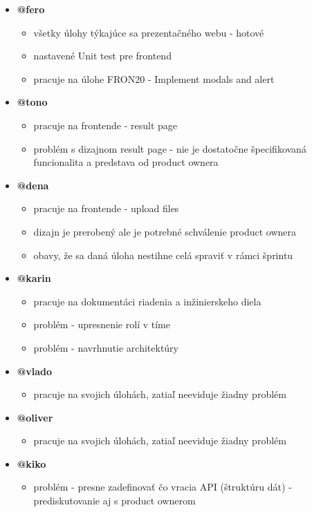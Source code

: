 \documentclass{article}
\begin{document}
    \begin{itemize}
        \item \textbf {@fero}
        \begin{itemize}
            \item všetky úlohy týkajúce sa prezentačného webu - hotové
            \item nastavené Unit test pre frontend
            \item pracuje na úlohe FRON20 - Implement modals and alert
        \end{itemize}
        \item \textbf {@tono}
        \begin{itemize}
            \item pracuje na frontende - result page
            \item problém s dizajnom result page - nie je dostatočne špecifikovaná funcionalita a predstava od product ownera
        \end{itemize}
        \item \textbf {@dena}
        \begin{itemize}
            \item pracuje na frontende - upload files
            \item dizajn je prerobený ale je potrebné schválenie product ownera
            \item obavy, že sa daná úloha nestihne celá spraviť v rámci šprintu
        \end{itemize}
        \item \textbf {@karin}
        \begin{itemize}
            \item pracuje na dokumentáci riadenia a inžinierskeho diela
            \item problém - upresnenie rolí v tíme
            \item problém - navrhnutie architektúry
        \end{itemize}
        \item \textbf {@vlado}
        \begin{itemize}
            \item pracuje na svojich úlohách, zatiaľ neeviduje žiadny problém
        \end{itemize}
        \item \textbf {@oliver}
        \begin{itemize}
            \item pracuje na svojich úlohách, zatiaľ neeviduje žiadny problém
        \end{itemize}
        \item \textbf {@kiko}
        \begin{itemize}
            \item problém - presne zadefinovať čo vracia API (štruktúru dát) - prediskutovanie aj s product ownerom
        \end{itemize}
    \end{itemize}    
\end{document}
